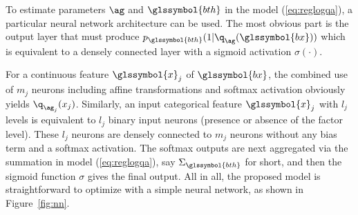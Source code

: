 To estimate parameters $\ag$ and $\glssymbol{bth}$ in the model (\ref{eq:reglogqa}), a particular neural network architecture can be used. The most obvious part is the output layer that must produce $p_{\glssymbol{bth}}(1|\q_{\ag}(\glssymbol{bx}))$ which is equivalent to a densely connected layer with a sigmoid activation $\sigma (\cdot)$.

For a continuous feature $\glssymbol{x}_j$ of $\glssymbol{bx}$, the combined use of $m_j$ neurons including affine transformations and softmax activation obviously yields $\q_{\ag_{j}}(x_j)$. Similarly, an input categorical feature $\glssymbol{x}_j$ with $l_j$ levels is equivalent to $l_j$ binary input neurons (presence or absence of the factor level). These $l_j$ neurons are densely connected to $m_j$ neurons without any bias term and a softmax activation. The softmax outputs are next aggregated via the summation in model (\ref{eq:reglogqa}), say $\Sigma_{\glssymbol{bth}}$ for short, and then the sigmoid function $\sigma$ gives the final output. All in all, the proposed model is straightforward to optimize with a simple neural network, as shown in Figure~\ref{fig:nn}.


\def\layersep{2.5cm}

